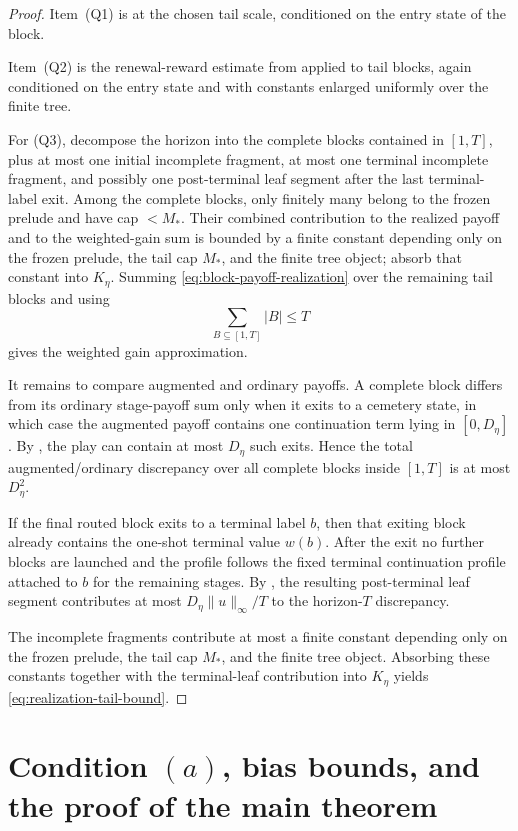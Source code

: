 \documentclass[12pt]{article}
\theoremstyle{definition}
\newcommand{\1}{\mathbf{1}}
\begin{document}
\begin{proof}
Item~(Q1) is  at the chosen tail scale, conditioned on
the entry state of the block.

Item~(Q2) is the renewal-reward estimate from 
applied to tail blocks, again conditioned on the entry state and with constants
enlarged uniformly over the finite tree.

For (Q3), decompose the horizon into the complete blocks contained in $[1,T]$,
plus at most one initial incomplete fragment, at most one terminal incomplete
fragment, and possibly one post-terminal leaf segment after the last
terminal-label exit. Among the complete blocks, only finitely many belong to the
frozen prelude and have cap $<M_*$. Their combined contribution to the realized
payoff and to the weighted-gain sum is bounded by a finite constant depending
only on the frozen prelude, the tail cap $M_*$, and the finite tree object;
absorb that constant into $K_\eta$. Summing
\eqref{eq:block-payoff-realization} over the remaining tail blocks and using
\[
\sum_{B\subseteq [1,T]} |B|\le T
\]
gives the weighted gain approximation.

It remains to compare augmented and ordinary payoffs. A complete block differs
from its ordinary stage-payoff sum only when it exits to a cemetery state, in
which case the augmented payoff contains one continuation term lying in
$[0,D_\eta]$. By , the play can contain at most $D_\eta$
such exits. Hence the total augmented/ordinary discrepancy over all complete
blocks inside $[1,T]$ is at most $D_\eta^2$.

If the final routed block exits to a terminal label $b$, then that exiting block
already contains the one-shot terminal value $w(b)$. After the exit no further
blocks are launched and the profile follows the fixed terminal continuation
profile attached to $b$ for the remaining stages. By
, the resulting post-terminal leaf segment
contributes at most $D_\eta\|u\|_\infty/T$ to the horizon-$T$ discrepancy.

The incomplete fragments contribute at most a finite constant depending only on
the frozen prelude, the tail cap $M_*$, and the finite tree object. Absorbing
these constants together with the terminal-leaf contribution into $K_\eta$
yields \eqref{eq:realization-tail-bound}.
\end{proof}

\section{Condition \texorpdfstring{$(a)$}{(a)}, bias bounds, and the proof of the main theorem}
\label{sec:proof-main}
\end{document}
